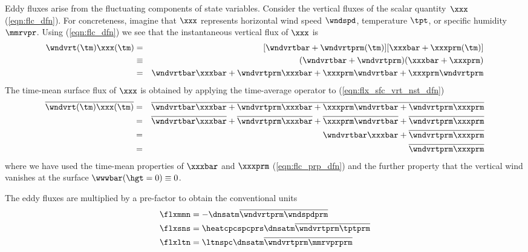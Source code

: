\documentclass[12pt,twoside]{book}
\begin{document}
Eddy fluxes arise from the fluctuating components of state variables.
Consider the vertical fluxes of the scalar quantity~$\xxx$
(\ref{eqn:flc_dfn}). 
For concreteness, imagine that $\xxx$ represents horizontal wind speed
$\wndspd$, temperature $\tpt$, or specific humidity $\mmrvpr$.
Using (\ref{eqn:flc_dfn}) we see that the instantaneous vertical flux
of $\xxx$ is 
 \begin{eqnarray}
\wndvrt(\tm)\xxx(\tm) & = & 
[\wndvrtbar + \wndvrtprm(\tm)][\xxxbar + \xxxprm(\tm)] \nonumber \\
& \equiv & (\wndvrtbar + \wndvrtprm)(\xxxbar + \xxxprm) \nonumber \\
& = & \wndvrtbar\xxxbar + \wndvrtprm\xxxbar + \xxxprm\wndvrtbar + \xxxprm\wndvrtprm
\label{eqn:flx_sfc_vrt_nst_dfn}
\end{eqnarray}
The time-mean surface flux of $\xxx$ is obtained by applying the
time-average operator to (\ref{eqn:flx_sfc_vrt_nst_dfn})  
\begin{eqnarray}
\overline{\wndvrt(\tm)\xxx(\tm)} & = & 
\overline{\wndvrtbar\xxxbar + \wndvrtprm\xxxbar + \xxxprm\wndvrtbar +
  \wndvrtprm\xxxprm} \nonumber \\
& = & 
\overline{\wndvrtbar\xxxbar} + \overline{\wndvrtprm\xxxbar} +
\overline{\xxxprm\wndvrtbar} + \overline{\wndvrtprm\xxxprm} \nonumber \\
& = & 
\wndvrtbar\xxxbar + \overline{\wndvrtprm\xxxprm} \nonumber \\
& = & 
\overline{\wndvrtprm\xxxprm}
\label{eqn:flx_sfc_vrt_nst_dfn}
\end{eqnarray}
where we have used the time-mean properties of $\xxxbar$ and $\xxxprm$
(\ref{eqn:flc_prp_dfn}) and the further property that the vertical
wind vanishes at the surface $\wwwbar(\hgt = 0) \equiv 0$.

The eddy fluxes are multiplied by a pre-factor to obtain the
conventional units
\begin{subequations}
\label{eqn:flx_trb_sfc_dfn}
\begin{align}
\label{eqn:flx_trb_mmn_dfn}
\flxmmn & = - \dnsatm \overline{ \wndvrtprm \wndspdprm } \\ %
\label{eqn:flx_trb_heat_dfn}
\flxsns & = \heatcpcspcprs \dnsatm \overline{ \wndvrtprm \tptprm } \\ %
\label{eqn:flx_trb_vpr_dfn}
\flxltn & = \ltnspc \dnsatm \overline{ \wndvrtprm \mmrvprprm } %
\end{align}
\end{subequations}
\end{document}
